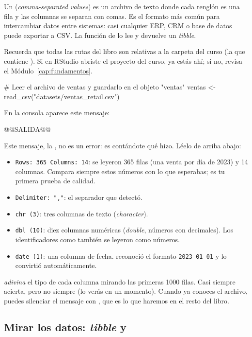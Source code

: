 Un  (\emph{comma-separated values}) es un archivo de texto donde
cada renglón es una fila y las columnas se separan con comas. Es el formato
más común para intercambiar datos entre sistemas: casi cualquier ERP, CRM o
base de datos puede exportar a CSV. La función  de
 lo lee y devuelve un \emph{tibble}.

Recuerda que todas las rutas del libro son relativas a la carpeta del curso
(la que contiene ). Si en RStudio abriste el proyecto del
curso, ya estás ahí; si no, revisa el Módulo~\ref{cap:fundamentos}.

\begin{rcode}
# Leer el archivo de ventas y guardarlo en el objeto "ventas"
ventas <- read_csv("datasets/ventas_retail.csv")
\end{rcode}
En la consola aparece este mensaje:
\begin{rsalida}
@@SALIDA@@
\end{rsalida}

Este mensaje, la , no es un error: es
 contándote qué hizo. Léelo de arriba abajo:

\begin{itemize}
  \item \texttt{Rows: 365 Columns: 14}: se leyeron 365 filas (una venta por
        día de 2023) y 14 columnas. Compara siempre estos números con lo que
        esperabas; es tu primera prueba de calidad.
  \item \texttt{Delimiter: ","}: el separador que detectó.
  \item \texttt{chr (3)}: tres columnas de texto (\emph{character}).
  \item \texttt{dbl (10)}: diez columnas numéricas (\emph{double}, números
        con decimales). Los identificadores como 
        también se leyeron como números.
  \item \texttt{date (1)}: una columna de fecha.  reconoció
        el formato \texttt{2023-01-01} y lo convirtió automáticamente.
\end{itemize}

 \emph{adivina} el tipo de cada columna mirando las primeras
1000 filas. Casi siempre acierta, pero no siempre (lo verás en un momento).
Cuando ya conoces el archivo, puedes silenciar el mensaje con
, que es lo que haremos en el resto del
libro.

\subsection{Mirar los datos: \texorpdfstring{\emph{tibble}}{tibble} y
\texorpdfstring{}{glimpse()}}

